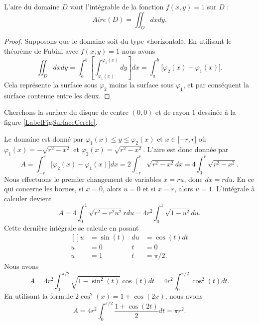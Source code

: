 \begin{proposition}
    L'aire du domaine $D$ vaut l'intégrable de la fonction $f(x,y)=1$ sur $D$ :
    \begin{equation}
        Aire(D)=\iint_Ddxdy.
    \end{equation}
\end{proposition}

\begin{proof}
    Supposons que le domaine soit du type «horizontal». En utilisant le théorème de Fubini avec $f(x,y)=1$ nous avons
    \begin{equation}
        \iint_Ddxdy=\int_a^b\left[ \int_{\varphi_1(x)}^{\varphi_2(x)}dy \right]dx=\int_a^b\big[ \varphi_2(x)-\varphi_1(x) \big].
    \end{equation}
    Cela représente la surface sous $\varphi_2$ moins la surface sous $\varphi_1$, et par conséquent la surface contenue entre les deux.
\end{proof}

\begin{example}
    Cherchons la surface du disque de centre $(0,0)$ et de rayon $1$ dessinée à la figure \ref{LabelFigSurfaceCercle}.
    \newcommand{\CaptionFigSurfaceCercle}{En bleu, la fonction $\sqrt{r^2-x^2}$ et en rouge, la fonction $-\sqrt{r^2-x^2}$.}
    

    Le domaine est donné par $\varphi_1(x)\leq y\leq \varphi_2(x)$ et $x\in\mathopen[ -r ,r \mathclose]$ où $\varphi_1(x)=-\sqrt{r^2-x^2}$ et $\varphi_2(x)=\sqrt{r^2-x^2}$. L'aire est donc donnée par
    \begin{equation}
        A=\int_{-r}^r\big[ \varphi_2(x)-\varphi_1(x) \big]dx=2\int_{-r}^r\sqrt{r^2-x^2}dx=4\int_0^r\sqrt{r^2-x^2}.
    \end{equation}
    Nous effectuons le premier changement de variables $x=ru$, donc $dx=rdu$. En ce qui concerne les bornes, si $x=0$, alors $u=0$ et si $x=r$, alors $u=1$. L'intégrale à calculer devient
    \begin{equation}
        A=4\int_0^1\sqrt{r^2-r^2u^2}rdu=4r^2\int_0^1\sqrt{1-u^2}du.
    \end{equation}
    Cette dernière intégrale se calcule en posant
    \begin{equation}
        \begin{aligned}[]
            u&=\sin(t)&du&=\cos(t)dt\\
            u&=0&t&=0\\
            u&=1&t&=\pi/2.
        \end{aligned}
    \end{equation}
    Nous avons
    \begin{equation}
        A=4r^2\int_0^{\pi/2}\sqrt{1-\sin^2(t)}\cos(t)dt=4r^2\int_0^{\pi/2}\cos^2(t)dt.
    \end{equation}
    En utilisant la formule $2\cos^2(x)=1+\cos(2x)$, nous avons
    \begin{equation}
        A=4r^2\int_0^{\pi/2}\frac{ 1+\cos(2t) }{ 2 }dt=\pi r^2.
    \end{equation}
\end{example}

